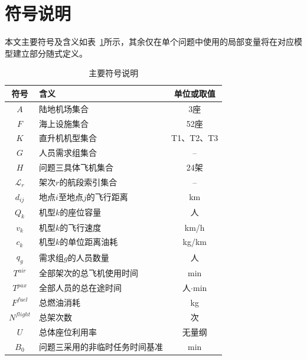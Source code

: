 \section{符号说明}\label{sec:notation}

本文主要符号及含义如表~\ref{tab:notation}所示，其余仅在单个问题中使用的局部变量将在对应模型建立部分随式定义。

\begin{table}[htbp]
    \centering
    \caption{主要符号说明}
    \label{tab:notation}
    \begin{tabular}{c l c}
        \toprule
        符号 & 含义 & 单位或取值 \\
        \midrule
        $A$ & 陆地机场集合 & 3座 \\
        $F$ & 海上设施集合 & 52座 \\
        $K$ & 直升机机型集合 & T1、T2、T3 \\
        $G$ & 人员需求组集合 & -- \\
        $H$ & 问题三具体飞机集合 & 24架 \\
        $\mathcal L_r$ & 架次$r$的航段索引集合 & -- \\
        $d_{ij}$ & 地点$i$至地点$j$的飞行距离 & km \\
        $Q_k$ & 机型$k$的座位容量 & 人 \\
        $v_k$ & 机型$k$的飞行速度 & km/h \\
        $c_k$ & 机型$k$的单位距离油耗 & kg/km \\
        $q_g$ & 需求组$g$的人员数量 & 人 \\
        $T^{air}$ & 全部架次的总飞机使用时间 & min \\
        $T^{pax}$ & 全部人员的总在途时间 & 人$\cdot$min \\
        $F^{fuel}$ & 总燃油消耗 & kg \\
        $N^{flight}$ & 总架次数 & 次 \\
        $U$ & 总体座位利用率 & 无量纲 \\
        $B_0$ & 问题三采用的非临时任务时间基准 & min \\
        \bottomrule
    \end{tabular}
\end{table}
